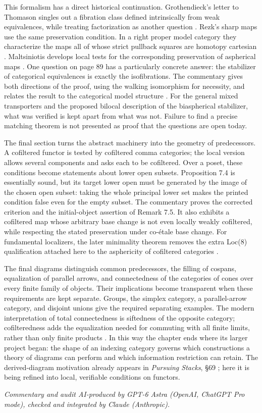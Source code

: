This formalism has a direct historical continuation. Grothendieck's letter
to Thomason singles out a fibration class defined intrinsically from weak
equivalences, while treating factorization as another question
\citep[\S1, pp.~3--4]{Grothendieck1991Letter}. Rezk's sharp maps use the same
preservation condition. In a right proper model category they characterize
the maps all of whose strict pullback squares are homotopy cartesian
\citep[Propositions 2.2 and 2.7]{Rezk1998Sharp}. Maltsiniotis develops local
tests for the corresponding preservation of aspherical maps
\citep[Definition 4.6 and Theorem 4.13]{Maltsiniotis2005Asphericite}.
One question on page 89 has a particularly concrete answer: the stabilizer
of categorical equivalences is exactly the isofibrations. The commentary gives
both directions of the proof, using the walking isomorphism for necessity,
and relates the result to the categorical model structure
\citep[\S2 and Theorem 3.1]{Rezk1996Categories}. For the general mixed
transporters and the proposed bilocal description of the biaspherical
stabilizer, what was verified is kept apart from what was not. Failure to find
a precise matching theorem is not presented as proof that the questions
are open today.

The final section turns the abstract machinery into the geometry of
predecessors. A cofiltered functor is tested by cofiltered comma categories;
the local version allows several components and asks each to be
cofiltered. Over a poset, these conditions become statements about lower
open subsets. Proposition 7.4 is essentially sound, but its target lower
open must be generated by the image of the chosen open subset: taking the
whole principal lower set makes the printed condition false even for the
empty subset. The commentary proves the corrected criterion and the
initial-object assertion of Remark 7.5. It also exhibits a cofiltered map
whose arbitrary base change is not even locally weakly cofiltered, while
respecting the stated preservation under co-étale base change. For
fundamental localizers, the later minimality theorem removes the extra
Loc(8) qualification attached here to the asphericity of cofiltered
categories \citep[Theorem 2.2.11]{Cisinski2004Minimal}.

The final diagrams distinguish common predecessors, the filling of
cospans, equalization of parallel arrows, and connectedness of the
categories of cones over every finite family of objects. Their implications
become transparent when these requirements are
kept separate. Groups, the simplex category, a parallel-arrow category,
and disjoint unions give the required separating examples. The modern
interpretation of total connectedness is siftedness of the opposite
category; cofilteredness adds the equalization needed for commuting with
all finite limits, rather than only finite products
\citep{AdamekRosickyVitale2010,StacksFiltered2026,Tendas2024}. In this way the
chapter ends where its larger project began: the shape of an indexing
category governs which constructions a theory of diagrams can perform
and which information restriction can retain. The derived-diagram
motivation already appears in \emph{Pursuing Stacks}, \S69
\citep{Grothendieck1983}; here it is being refined into local, verifiable
conditions on functors.

\medskip
\noindent\emph{Commentary and audit AI-produced by GPT-6 Astra (OpenAI, ChatGPT Pro mode),
checked and integrated by Claude (Anthropic).}
\nocite{*}
\endgroup
